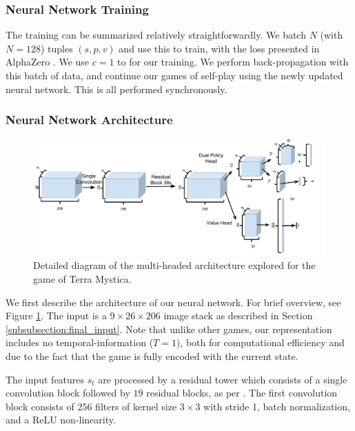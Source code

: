 \documentclass[10pt,twocolumn,letterpaper]{article}
\begin{document}
\subsubsection{Neural Network Training}
The training can be summarized relatively straightforwardly. We batch $N$  (with $N = 128$) tuples $(s,p,v)$ and use this to train, with the loss presented in AlphaZero \cite{AlphaZero}. We use $c = 1$ to for our training. We perform back-propagation with this batch of data, and continue our games of self-play using the newly updated neural network. This is all performed synchronously.  


\subsubsection{Neural Network Architecture}
\label{subsubsection:neural_network_architecture}
\begin{figure}[!ht]
    \centering
    \includegraphics[scale=0.09]{figures/architecture_2.png}
    \caption{Detailed diagram of the multi-headed architecture explored for the game of Terra Mystica.}
    \label{fig:architecture}
\end{figure}

We first describe the architecture of our neural network. For brief overview, see Figure \ref{fig:architecture}. The input is a $9 \times 26 \times 206$ image stack as described in Section \ref{subsubsection:final_input}. Note that unlike other games, our representation includes no temporal-information ($T = 1$), both for computational efficiency and due to the fact that the game is fully encoded with the current state. 

The input features $s_t$ are processed by a residual tower which consists of a single convolution block  followed by $19$ residual blocks, as per \cite{AlphaGoZero}. The first convolution block consists of 256 filters of kernel size $3 \times 3$ with stride 1, batch normalization, and a ReLU non-linearity. 
\end{document}
